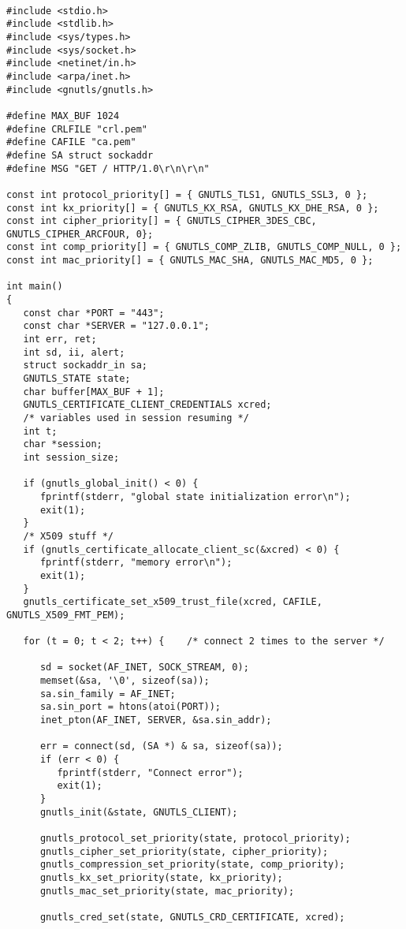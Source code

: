 \begin{verbatim}

#include <stdio.h>
#include <stdlib.h>
#include <sys/types.h>
#include <sys/socket.h>
#include <netinet/in.h>
#include <arpa/inet.h>
#include <gnutls/gnutls.h>

#define MAX_BUF 1024
#define CRLFILE "crl.pem"
#define CAFILE "ca.pem"
#define SA struct sockaddr
#define MSG "GET / HTTP/1.0\r\n\r\n"

const int protocol_priority[] = { GNUTLS_TLS1, GNUTLS_SSL3, 0 };
const int kx_priority[] = { GNUTLS_KX_RSA, GNUTLS_KX_DHE_RSA, 0 };
const int cipher_priority[] = { GNUTLS_CIPHER_3DES_CBC, GNUTLS_CIPHER_ARCFOUR, 0};
const int comp_priority[] = { GNUTLS_COMP_ZLIB, GNUTLS_COMP_NULL, 0 };
const int mac_priority[] = { GNUTLS_MAC_SHA, GNUTLS_MAC_MD5, 0 };

int main()
{
   const char *PORT = "443";
   const char *SERVER = "127.0.0.1";
   int err, ret;
   int sd, ii, alert;
   struct sockaddr_in sa;
   GNUTLS_STATE state;
   char buffer[MAX_BUF + 1];
   GNUTLS_CERTIFICATE_CLIENT_CREDENTIALS xcred;
   /* variables used in session resuming */
   int t;
   char *session;
   int session_size;

   if (gnutls_global_init() < 0) {
      fprintf(stderr, "global state initialization error\n");
      exit(1);
   }
   /* X509 stuff */
   if (gnutls_certificate_allocate_client_sc(&xcred) < 0) {
      fprintf(stderr, "memory error\n");
      exit(1);
   }
   gnutls_certificate_set_x509_trust_file(xcred, CAFILE, GNUTLS_X509_FMT_PEM);

   for (t = 0; t < 2; t++) {    /* connect 2 times to the server */

      sd = socket(AF_INET, SOCK_STREAM, 0);
      memset(&sa, '\0', sizeof(sa));
      sa.sin_family = AF_INET;
      sa.sin_port = htons(atoi(PORT));
      inet_pton(AF_INET, SERVER, &sa.sin_addr);

      err = connect(sd, (SA *) & sa, sizeof(sa));
      if (err < 0) {
         fprintf(stderr, "Connect error");
         exit(1);
      }
      gnutls_init(&state, GNUTLS_CLIENT);

      gnutls_protocol_set_priority(state, protocol_priority);
      gnutls_cipher_set_priority(state, cipher_priority);
      gnutls_compression_set_priority(state, comp_priority);
      gnutls_kx_set_priority(state, kx_priority);
      gnutls_mac_set_priority(state, mac_priority);

      gnutls_cred_set(state, GNUTLS_CRD_CERTIFICATE, xcred);


\end{verbatim}
